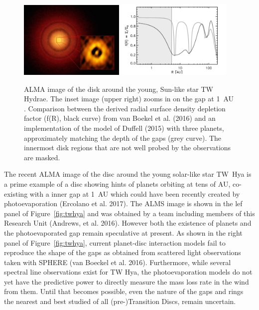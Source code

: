 \documentclass[10pt,fleqn,twoside]{article}
\begin{document}
\begin{figure}
\centerline{\includegraphics[width=0.45\textwidth]{twhya.jpg}
\includegraphics[width=0.5\textwidth]{vanboekel.pdf}}
\caption{ ALMA image of the disk around the young,
  Sun-like star TW Hydrae. The inset image (upper right) zooms in on
  the gap at 1~AU .  Comparison between the derived radial surface density
depletion factor (f(R), black curve) from van Boekel et al. (2016) and an implementation
of the model of Duffell (2015) with three planets, approximately
matching the depth of the gaps (grey curve). The innermost disk
regions that are not well probed by the observations are masked. } 
\end{figure}


The recent ALMA image of the disc around the young solar-like star TW~Hya is a prime example of a disc showing hints of
planets orbiting at tens of AU,  co-existing with a inner gap at 1~AU
which could have been 
recently created by photoevaporation (Ercolano et al. 2017). The ALMS image
is shown in the lef panel of Figure~\ref{fig:twhya} and was obtained by
a team including members of this Research Unit (Andrews, et
al. 2016). However both the existence of planets and the
photoevaporated gap remain speculative at present. As shown in the
right panel of Figure~\ref{fig:twhya}, current planet-disc interaction
models fail to reproduce the shape of the gaps as obtained from
scattered light observations taken with SPHERE (van Boeckel et
al. 2016). Furthermore, while several spectral line observations exist
for TW Hya, the photoevaporation models do not yet have the predictive
power to directly measure the mass loss rate in the wind from
them. Until that becomes possible, even the nature of the gaps and rings
the nearest and best studied of all (pre-)Transition Discs, remain
uncertain. 
\end{document}
